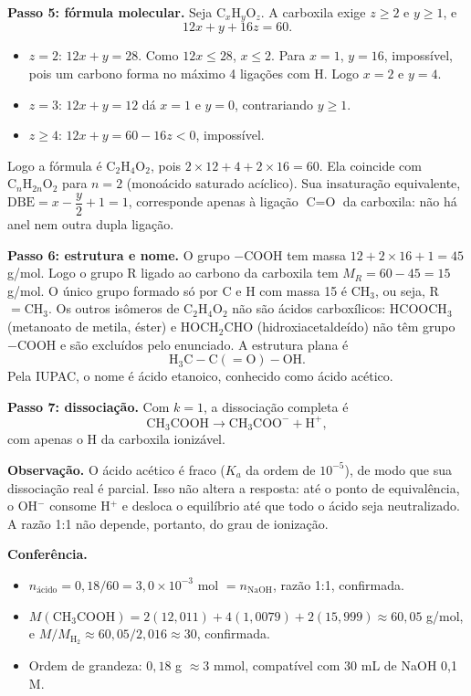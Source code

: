 \documentclass{article}%
\begin{document}
\textbf{Passo 5: fórmula molecular.} Seja $\text{C}_x\text{H}_y\text{O}_z$. A carboxila exige $z \geq 2$ e $y \geq 1$, e
\[
12x + y + 16z = 60.
\]
\begin{itemize}
\item $z = 2$: $12x + y = 28$. Como $12x \leq 28$, $x \leq 2$. Para $x = 1$, $y = 16$, impossível, pois um carbono forma no máximo 4 ligações com H. Logo $x = 2$ e $y = 4$.
\item $z = 3$: $12x + y = 12$ dá $x = 1$ e $y = 0$, contrariando $y \geq 1$.
\item $z \geq 4$: $12x + y = 60 - 16z < 0$, impossível.
\end{itemize}
Logo a fórmula é $\text{C}_2\text{H}_4\text{O}_2$, pois $2 \times 12 + 4 + 2 \times 16 = 60$. Ela coincide com $\text{C}_n\text{H}_{2n}\text{O}_2$ para $n = 2$ (monoácido saturado acíclico). Sua insaturação equivalente, $\text{DBE} = x - \dfrac{y}{2} + 1 = 1$, corresponde apenas à ligação $\text{C}=\text{O}$ da carboxila: não há anel nem outra dupla ligação.

\textbf{Passo 6: estrutura e nome.} O grupo $-\text{COOH}$ tem massa $12 + 2 \times 16 + 1 = 45$ g/mol. Logo o grupo R ligado ao carbono da carboxila tem $M_R = 60 - 45 = 15$ g/mol. O único grupo formado só por C e H com massa 15 é $\text{CH}_3$, ou seja, R $=\text{CH}_3$. Os outros isômeros de C$_2$H$_4$O$_2$ não são ácidos carboxílicos: HCOOCH$_3$ (metanoato de metila, éster) e HOCH$_2$CHO (hidroxiacetaldeído) não têm grupo $-\text{COOH}$ e são excluídos pelo enunciado. A estrutura plana é
\[
\text{H}_3\text{C}-\text{C}(=\text{O})-\text{OH}.
\]
Pela IUPAC, o nome é ácido etanoico, conhecido como ácido acético.

\textbf{Passo 7: dissociação.} Com $k = 1$, a dissociação completa é
\[
\text{CH}_3\text{COOH} \rightarrow \text{CH}_3\text{COO}^- + \text{H}^+,
\]
com apenas o H da carboxila ionizável.

\textbf{Observação.} O ácido acético é fraco ($K_a$ da ordem de $10^{-5}$), de modo que sua dissociação real é parcial. Isso não altera a resposta: até o ponto de equivalência, o OH$^-$ consome H$^+$ e desloca o equilíbrio até que todo o ácido seja neutralizado. A razão 1:1 não depende, portanto, do grau de ionização.

\textbf{Conferência.}
\begin{itemize}
\item $n_{\text{ácido}} = 0{,}18/60 = 3{,}0 \times 10^{-3}$ mol $= n_{\text{NaOH}}$, razão 1:1, confirmada.
\item $M(\text{CH}_3\text{COOH}) = 2(12{,}011) + 4(1{,}0079) + 2(15{,}999) \approx 60{,}05$ g/mol, e $M/M_{\text{H}_2} \approx 60{,}05/2{,}016 \approx 30$, confirmada.
\item Ordem de grandeza: $0{,}18$ g $\approx 3$ mmol, compatível com 30 mL de NaOH 0,1 M.
\end{itemize}
\end{document}
